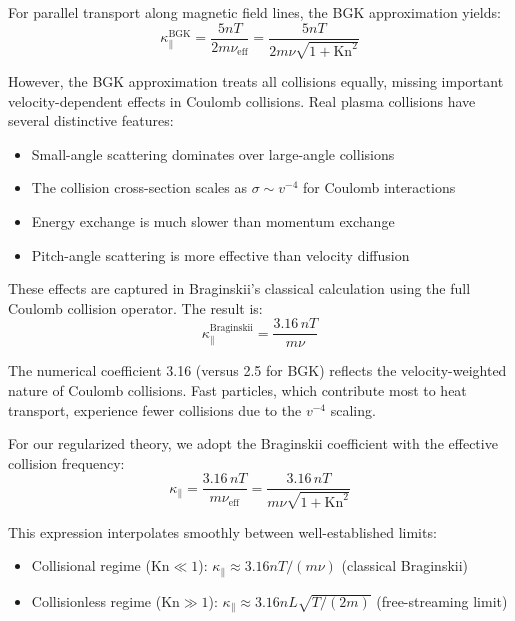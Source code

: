 \documentclass[12pt,a4paper]{article}
\newcommand{\Kn}{\text{Kn}}
\newcommand{\eff}{\text{eff}}
\begin{document}
For parallel transport along magnetic field lines, the BGK approximation yields:
\begin{equation}
\kappa_{\parallel}^{\text{BGK}} = \frac{5nT}{2m\nu_{\eff}} = \frac{5nT}{2m\nu\sqrt{1 + \Kn^2}}
\label{eq:kappa_parallel_bgk}
\end{equation}

However, the BGK approximation treats all collisions equally, missing important velocity-dependent effects in Coulomb collisions. Real plasma collisions have several distinctive features:
\begin{itemize}[leftmargin=*]
\item Small-angle scattering dominates over large-angle collisions
\item The collision cross-section scales as $\sigma \sim v^{-4}$ for Coulomb interactions
\item Energy exchange is much slower than momentum exchange
\item Pitch-angle scattering is more effective than velocity diffusion
\end{itemize}

These effects are captured in Braginskii's classical calculation using the full Coulomb collision operator. The result is:
\begin{equation}
\kappa_{\parallel}^{\text{Braginskii}} = \frac{3.16 \, nT}{m\nu}
\label{eq:kappa_parallel_braginskii}
\end{equation}

The numerical coefficient 3.16 (versus 2.5 for BGK) reflects the velocity-weighted nature of Coulomb collisions. Fast particles, which contribute most to heat transport, experience fewer collisions due to the $v^{-4}$ scaling.

For our regularized theory, we adopt the Braginskii coefficient with the effective collision frequency:
\begin{equation}
\boxed{\kappa_{\parallel} = \frac{3.16 \, nT}{m\nu_{\eff}} = \frac{3.16 \, nT}{m\nu\sqrt{1 + \Kn^2}}}
\label{eq:kappa_parallel_final}
\end{equation}

This expression interpolates smoothly between well-established limits:
\begin{itemize}[leftmargin=*]
\item Collisional regime ($\Kn \ll 1$): $\kappa_{\parallel} \approx 3.16nT/(m\nu)$ (classical Braginskii)
\item Collisionless regime ($\Kn \gg 1$): $\kappa_{\parallel} \approx 3.16nL\sqrt{T/(2m)}$ (free-streaming limit)
\end{itemize}
\end{document}
